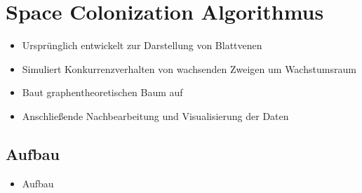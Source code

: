 \newpage
\slidetitle{}
\section{Space Colonization Algorithmus\\}

\begin{itemize}
	\item Ursprünglich entwickelt zur Darstellung von Blattvenen \\
	
	\item Simuliert Konkurrenzverhalten von wachsenden Zweigen um Wachstumsraum\\
	
	\item Baut graphentheoretischen Baum auf \\
	
	\item Anschließende Nachbearbeitung und Visualisierung der Daten
\end{itemize}


\newpage
{}
\subsection{Aufbau}

\begin{itemize}
\item Aufbau \\

\end{itemize}

